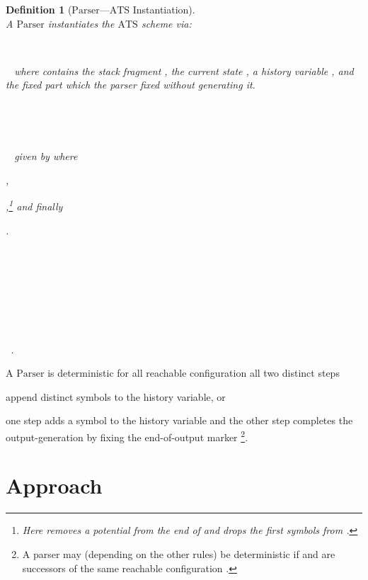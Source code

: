\documentclass[draft]{ifacconf}
\newtheorem{definition}{Definition}
\newcommand{\ATS}{\ensuremath{\mathrm{ATS}}\xspace}
\newcommand{\Parser}{\ensuremath{\mathrm{Parser}}\xspace}
\newcommand{\OUTm}[1]{o_{\var{m}}\ifthenelse{\isempty{#1}}{}{(#1)}}
\newcommand{\OUTum}[1]{o_{\var{um}}\ifthenelse{\isempty{#1}}{}{(#1)}}
\newcommand{\instantiate}[1]{{\fboxsep1pt\fbox{}}}
\begin{document}
\begin{definition}[\Parser---\ATS Instantiation]\label{def:ParserSemantics}\leavevmode\\
A \Parser  in\-stan\-ti\-ates the \ATS scheme
  via:
\begin{inparaenum}[(i)]
\item \instantiate{E}~
\item \instantiate{C}~ where  contains the stack fragment , the current state , a history variable , and the \emph{fixed} part  which the parser fixed without generating it.
\item \instantiate{S}~
\item \instantiate{\pi_S(\STACKSTR\sconc \STATEELEM,\SIGMASTR,\FIXEDSTR)}~
\item \instantiate{R}~ given by  where
  \begin{inparaenum}[(a)]
  \item ,
  \item ,\!\footnote{Here  removes a potential  from the end of  and  drops the first  symbols from .} and finally
  \item .
  \end{inparaenum}
\item \instantiate{c_0}~
\item \instantiate{A}~
\item \instantiate{O}~
\item \instantiate{\OUTm{\STACKSTR\sconc \STATEELEM,\SIGMASTR,\FIXEDSTR}}~
\item \instantiate{\OUTum{\STACKSTR\sconc \STATEELEM,\SIGMASTR,\FIXEDSTR}}~.
\end{inparaenum}
\end{definition}
A \Parser is deterministic \IFF for all reachable configuration all two distinct steps
\begin{inparaenum}[(i)]
\item append distinct symbols to the history variable, or
\item one step adds a symbol to the history variable and the other step completes the output-generation by fixing the end-of-output marker \footnote{A parser may (depending on the other rules) be deterministic if  and  are successors of the same reachable configuration .}.
\end{inparaenum}

\section{Approach}\label{sect:ALG}
\newcommand{\EdgeLabel}[3]{{#1}\kern-1pt{,}\kern-1pt{#2}\kern-1pt{,}\kern-1pt{#3}}
\newcommand{\EdgeSep}{;}
\end{document}
